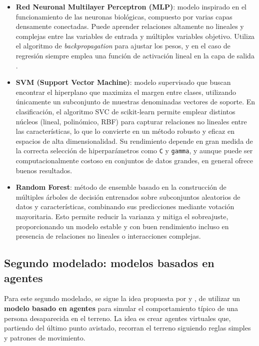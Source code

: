 \begin{itemize}
    \item \textbf{Red Neuronal Multilayer Perceptron (MLP)}: modelo inspirado en el funcionamiento de las neuronas biológicas, compuesto por varias capas densamente conectadas. Puede aprender relaciones altamente no lineales y complejas entre las variables de entrada y múltiples variables objetivo. Utiliza el algoritmo de \textit{backpropagation} para ajustar los pesos, y en el caso de regresión siempre emplea una función de activación lineal en la capa de salida \cite{sklearn_nn, sklearn_nn_mlp}.

    \item \textbf{SVM (Support Vector Machine)}: modelo supervisado que buscan encontrar el hiperplano que maximiza el margen entre clases, utilizando únicamente un subconjunto de muestras denominadas vectores de soporte. En clasificación, el algoritmo SVC de scikit‑learn permite emplear distintos núcleos (lineal, polinómico, RBF) para capturar relaciones no lineales entre las características, lo que lo convierte en un método robusto y eficaz en espacios de alta dimensionalidad. Su rendimiento depende en gran medida de la correcta selección de hiperparámetros como \texttt{C} y \texttt{gamma}, y aunque puede ser computacionalmente costoso en conjuntos de datos grandes, en general ofrece buenos resultados\cite{sklearn_svm}.

    \item \textbf{Random Forest}: método de ensemble basado en la construcción de múltiples árboles de decisión entrenados sobre subconjuntos aleatorios de datos y características, combinando sus predicciones mediante votación mayoritaria. Esto permite reducir la varianza y mitiga el sobreajuste, proporcionando un modelo estable y con buen rendimiento incluso en presencia de relaciones no lineales o interacciones complejas\cite{sklearn_random_forest}. 
\end{itemize}

\subsection{Segundo modelado: modelos basados en agentes}

Para este segundo modelado, se sigue la idea propuesta por \cite{Agent_based_pred1} y \cite{Agent_based_pred2}, de utilizar un \textbf{modelo basado en agentes} para simular el comportamiento típico de una persona desaparecida en el terreno. La idea es crear agentes virtuales que, partiendo del último punto avistado, recorran el terreno siguiendo reglas simples y patrones de movimiento.

